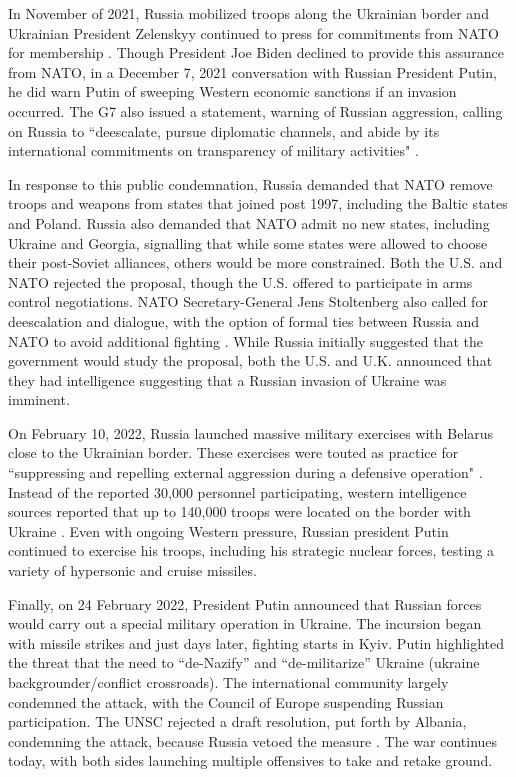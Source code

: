\documentclass[12pt]{article}
\begin{document}
In November of 2021, Russia mobilized troops along the Ukrainian border and Ukrainian President Zelenskyy continued to press for commitments from NATO for membership \citep{walker_conflict_2023}. Though President Joe Biden declined to provide this assurance from NATO, in a December 7, 2021 conversation with Russian President Putin, he did warn Putin of sweeping Western economic sanctions if an invasion occurred. The G7 also issued a statement, warning of Russian aggression, calling on Russia to “deescalate, pursue diplomatic channels, and abide by its international commitments on transparency of military activities" \citep{foreign_and_commonwealth_office_g7_2014}. 

In response to this public condemnation, Russia demanded that NATO remove troops and weapons from states that joined post 1997, including the Baltic states and Poland. Russia also demanded that NATO admit no new states, including Ukraine and Georgia, signalling that while some states were allowed to choose their post-Soviet alliances, others would be more constrained. Both the U.S. and NATO rejected the proposal, though the U.S. offered to participate in arms control negotiations. NATO Secretary-General Jens Stoltenberg also called for deescalation and dialogue, with the option of formal ties between Russia and NATO to avoid additional fighting \citep{al_jazeera_us_2022}. While Russia initially suggested that the government would study the proposal, both the U.S. and U.K. announced that they had intelligence suggesting that a Russian invasion of Ukraine was imminent. 

On February 10, 2022, Russia launched massive military exercises with Belarus close to the Ukrainian border. These exercises were touted as practice for “suppressing and repelling external aggression during a defensive operation" \citep{walker_conflict_2024}. Instead of the reported 30,000 personnel participating, western intelligence sources reported that up to 140,000 troops were located on the border with Ukraine \citep{walker_conflict_2024}. Even with ongoing Western pressure, Russian president Putin continued to exercise his troops, including his strategic nuclear forces, testing a variety of hypersonic and cruise missiles. 

Finally, on 24 February 2022, President Putin announced that Russian forces would carry out a special military operation in Ukraine. The incursion began with missile strikes and just days later, fighting starts in Kyiv. Putin highlighted the threat that the need to “de-Nazify” and “de-militarize” Ukraine (ukraine backgrounder/conflict crossroads). The international community largely condemned the attack, with the Council of Europe suspending Russian participation. The UNSC rejected a draft resolution, put forth by Albania, condemning the attack, because Russia vetoed the measure \citep{walker_conflict_2024}. The war continues today, with both sides launching multiple offensives to take and retake ground. 
\end{document}
